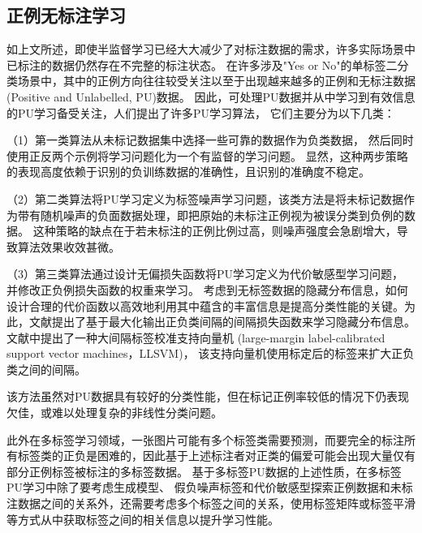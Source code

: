 \subsection{正例无标注学习}
如上文所述，即使半监督学习已经大大减少了对标注数据的需求，许多实际场景中已标注的数据仍然存在不完整的标注状态。
在许多涉及"Yes or No"的单标签二分类场景中，其中的正例方向往往较受关注以至于出现越来越多的正例和无标注数据(Positive and Unlabelled, PU)数据。
因此，可处理PU数据并从中学习到有效信息的PU学习备受关注，人们提出了许多PU学习算法，
它们主要分为以下几类：

{
（1）第一类算法从未标记数据集中选择一些可靠的数据作为负类数据，
然后同时使用正反两个示例将学习问题化为一个有监督的学习问题\cite{Youngs_SMD_2015,Luo_Simple_2017}。
显然，这种两步策略的表现高度依赖于识别的负训练数据的准确性，且识别的准确度不稳定。

（2）第二类算法将PU学习定义为标签噪声学习问题，该类方法是将未标记数据作为带有随机噪声的负面数据处理，即把原始的未标注正例视为被误分类到负例的数据\cite{Lee_WLR_2003}。
这种策略的缺点在于若未标注的正例比例过高，则噪声强度会急剧增大，导致算法效果收效甚微。

（3）第三类算法通过设计无偏损失函数将PU学习定义为代价敏感型学习问题，
并修改正负例损失函数的权重来学习\cite{Kiryo_Positive_2017}。
考虑到无标签数据的隐藏分布信息，如何设计合理的代价函数以高效地利用其中蕴含的丰富信息是提高分类性能的关键。为此，文献\parencite{Gong_Margin_2018}提出了基于最大化输出正负类间隔的间隔损失函数来学习隐藏分布信息。
文献\parencite{Gong_LLSVM_2019}中提出了一种大间隔标签校准支持向量机
(large-margin label-calibrated support vector machines，LLSVM)，
该支持向量机使用标定后的标签来扩大正负类之间的间隔。}
该方法虽然对PU数据具有较好的分类性能，但在标记正例率较低的情况下仍表现欠佳，或难以处理复杂的非线性分类问题。

此外在多标签学习领域，一张图片可能有多个标签类需要预测，而要完全的标注所有标签类的正负是困难的，因此基于上述标注者对正类的偏爱可能会出现大量仅有部分正例标签被标注的多标签数据\cite{Cole_SML_2021,Han_PUMulti_2018}。
基于多标签PU数据的上述性质，在多标签PU学习中除了要考虑生成模型\cite{Chu_PUML_2018}、
假负噪声标签\cite{Mac_PUML_2019,Sun_PUML_2010}和代价敏感型探索正例数据和未标注数据之间的关系外，还需要考虑多个标签之间的关系，使用标签矩阵或标签平滑等方式从中获取标签之间的相关信息以提升学习性能\cite{Hsieh_PUscnario1_2015,Szegedy_LabelSmooth_2016}。


